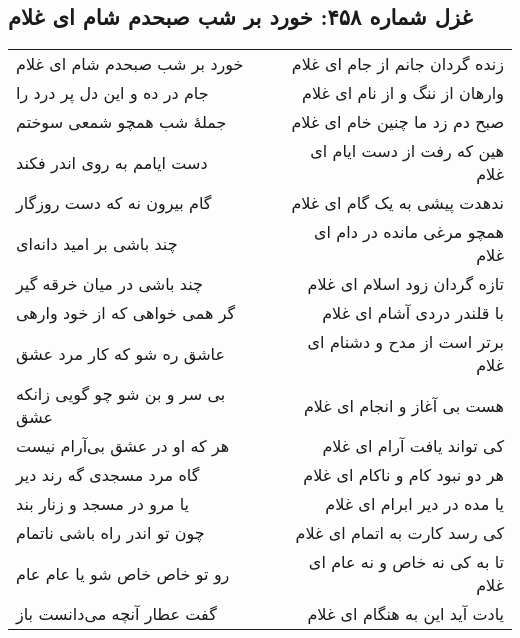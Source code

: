 \begin{center}
\section*{غزل شماره ۴۵۸: خورد بر شب صبحدم شام ای غلام}
\label{sec:458}
\begin{longtable}{l p{0.5cm} r}
خورد بر شب صبحدم شام ای غلام
&&
زنده گردان جانم از جام ای غلام
\\
جام در ده و این دل پر درد را
&&
وارهان از ننگ و از نام ای غلام
\\
جملهٔ شب همچو شمعی سوختم
&&
صبح دم زد ما چنین خام ای غلام
\\
دست ایامم به روی اندر فکند
&&
هین که رفت از دست ایام ای غلام
\\
گام بیرون نه که دست روزگار
&&
ندهدت پیشی به یک گام ای غلام
\\
چند باشی بر امید دانه‌ای
&&
همچو مرغی مانده در دام ای غلام
\\
چند باشی در میان خرقه گیر
&&
تازه گردان زود اسلام ای غلام
\\
گر همی خواهی که از خود وارهی
&&
با قلندر دردی آشام ای غلام
\\
عاشق ره شو که کار مرد عشق
&&
برتر است از مدح و دشنام ای غلام
\\
بی سر و بن شو چو گویی زانکه عشق
&&
هست بی آغاز و انجام ای غلام
\\
هر که او در عشق بی‌آرام نیست
&&
کی تواند یافت آرام ای غلام
\\
گاه مرد مسجدی گه رند دیر
&&
هر دو نبود کام و ناکام ای غلام
\\
یا مرو در مسجد و زنار بند
&&
یا مده در دیر ابرام ای غلام
\\
چون تو اندر راه باشی ناتمام
&&
کی رسد کارت به اتمام ای غلام
\\
رو تو خاص خاص شو یا عام عام
&&
تا به کی نه خاص و نه عام ای غلام
\\
گفت عطار آنچه می‌دانست باز
&&
یادت آید این به هنگام ای غلام
\\
\end{longtable}
\end{center}
